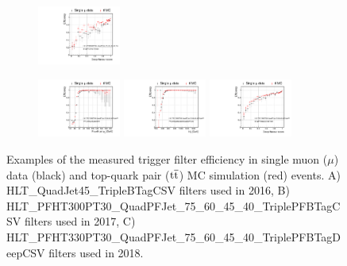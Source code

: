 \begin{figure}[htp!]
\begin{subfigure}{\textwidth}
\includegraphics[width=0.3\textwidth]{Figures/AnalysisStrategy/triggereff/plots_2017/Quad_75_60_45_40_3b_Efficiency_BTagPFCSVp070Triple.pdf}\\
      \end{subfigure}
      \begin{subfigure}{\textwidth}
  \centering
            \caption{}
\includegraphics[width=0.3\textwidth]{Figures/AnalysisStrategy/triggereff/plots_2018/Quad_75_60_45_40_3b_Efficiency_4PFCentralJetLooseID40.pdf}
\includegraphics[width=0.3\textwidth]{Figures/AnalysisStrategy/triggereff/plots_2018/Quad_75_60_45_40_3b_Efficiency_PFCentralJetsLooseIDQuad30HT330.pdf}
\includegraphics[width=0.3\textwidth]{Figures/AnalysisStrategy/triggereff/plots_2018/Quad_75_60_45_40_3b_Efficiency_BTagPFDeepCSV4p5Triple.pdf}
      \end{subfigure}
\caption[Examples of the measured trigger filter efficiency in single muon ($\mu$) data and top-quark pair ($\ttbar$) MC simulation events]{\label{fig:run2triggerefficiency}Examples of the measured trigger filter efficiency in single muon ($\mu$) data (black) and top-quark pair ($\ttbar$) MC simulation (red) events. A) HLT\_QuadJet45\_TripleBTagCSV filters used in 2016, B) HLT\_PFHT300PT30\_QuadPFJet\_75\_60\_45\_40\_TriplePFBTagCSV filters used in 2017, C) HLT\_PFHT330PT30\_QuadPFJet\_75\_60\_45\_40\_TriplePFBTagDeepCSV filters used in 2018.}
\end{figure}


